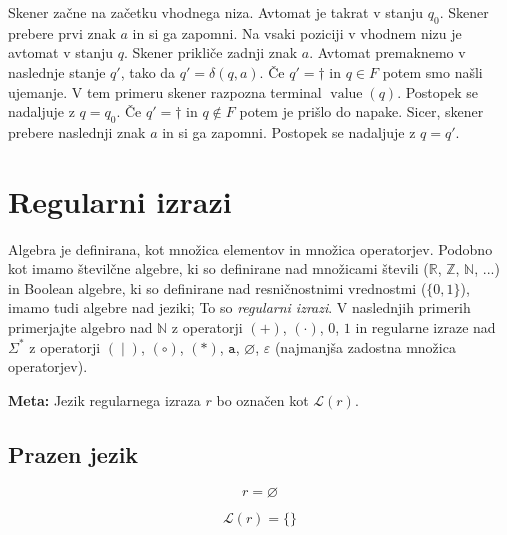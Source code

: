 \documentclass{article}
\DeclareMathOperator{\acc}{value}
\newcommand{\Special}[1]{\textbf{#1}}
\newcommand{\Empty}{\varnothing}
\newcommand{\Null}{\varepsilon}
\newcommand{\Language}[1]{\mathcal{L}(#1)}
\newcommand{\Automaton}[1]{\mathcal{M}(#1)}
\newcommand{\Char}[1]{\texttt{#1}}
\newcommand{\Union}{\mathrel{|}}
\newcommand{\Kleene}[1]{#1^\ast}
\begin{document}
Skener začne na začetku vhodnega niza.
Avtomat je takrat v stanju $q_0$.
Skener prebere prvi znak $a$ in si ga zapomni.
Na vsaki poziciji v vhodnem nizu je avtomat v stanju $q$.
Skener prikliče zadnji znak $a$.
Avtomat premaknemo v naslednje stanje $q'$, tako da $q' = \delta(q, a)$.
Če $q' = \dag$ in $q \in F$ potem smo našli ujemanje.
V tem primeru skener razpozna terminal $\acc(q)$.
Postopek se nadaljuje z $q = q_0$.
Če $q' = \dag$ in $q \not\in F$ potem je prišlo do napake.
Sicer, skener prebere naslednji znak $a$ in si ga zapomni. 
Postopek se nadaljuje z $q = q'$.

\section{Regularni izrazi}
Algebra je definirana, kot množica elementov in množica operatorjev.
Podobno kot imamo številčne algebre, ki so definirane nad množicami števili ($\mathbb{R}$, $\mathbb{Z}$, $\mathbb{N}$, ...) in Boolean algebre, ki so definirane nad resničnostnimi vrednostmi ($\{0, 1\}$), imamo tudi algebre nad jeziki;
To so \emph{regularni izrazi}.
V naslednjih primerih primerjajte algebro nad $\mathbb{N}$ z operatorji $(+)$, $(\cdot)$, $0$, $1$ in regularne izraze nad $\Kleene{\Sigma}$ z operatorji $(\Union)$, $(\circ)$, $(\ast)$, $\Char{a}$, $\Empty$, $\Null$ (najmanjša zadostna množica operatorjev).

\Special{Meta:} Jezik regularnega izraza $r$ bo označen kot $\Language{r}$.\\

\subsection{Prazen jezik}
\begin{equation*}
  r = \Empty
\end{equation*}

\begin{equation*}
  \Language{r} = \{\}
\end{equation*}

\begin{center}
\end{center}
\end{document}
